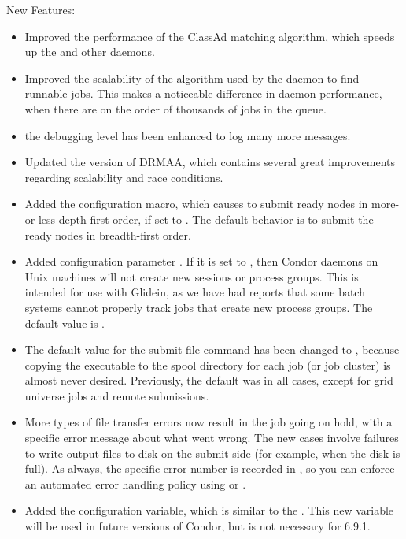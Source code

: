 \noindent New Features:

\begin{itemize}

\item Improved the performance of the ClassAd matching algorithm,
which speeds up the  and other daemons.

\item Improved the scalability of the algorithm used by 
the  daemon to find runnable jobs.
This makes a noticeable difference in  daemon performance,
when there are on the order of thousands of jobs in the queue.

\item the  debugging level has been enhanced to
log many more messages. 

\item Updated the version of DRMAA, which contains several great
improvements regarding scalability and race conditions.

\item Added the  configuration macro,
which causes  to submit ready nodes in more-or-less depth-first
order, if set to .  The default behavior is to submit
the ready nodes in breadth-first order.

\item Added configuration parameter .
If it is set to ,
then Condor daemons on Unix machines will not create new 
sessions or process groups. This is intended for use with Glidein, as
we have had reports that some batch systems cannot properly track jobs that
create new process groups. The default value is .

\item The default value for the submit file command
 has been changed to , because copying
the executable to the spool directory for each job (or job cluster) is almost
never desired.  Previously, the default was  in all
cases, except for grid universe jobs and remote submissions.

\item More types of file transfer errors now result in the job going
on hold, with a specific error message about what went wrong.  The new
cases involve failures to write output files to disk on the submit
side (for example, when the disk is full).
As always, the specific error number is
recorded in , so you can enforce an automated
error handling policy using  or
.

\item Added the 
configuration variable, which is similar to the 
.
This new variable will be used in future versions of Condor, but is
not necessary for 6.9.1.


\end{itemize}

